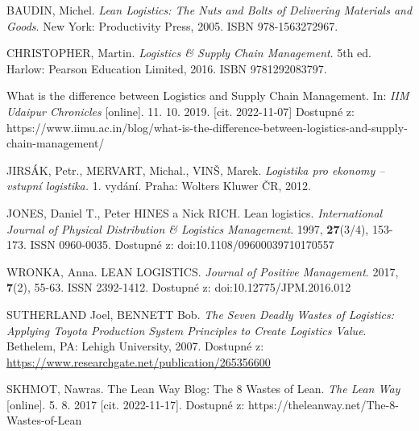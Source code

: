 



\begin{thebibliography}{1}

BAUDIN, Michel. \textit{Lean Logistics: The Nuts and Bolts of Delivering Materials and Goods}. New York: Productivity Press, 2005. ISBN 978-1563272967.

CHRISTOPHER, Martin. \textit{Logistics \& Supply Chain Management}. 5th ed. Harlow: Pearson Education Limited, 2016. ISBN 9781292083797.

What is the difference between Logistics and Supply Chain Management. In: \textit{IIM Udaipur Chronicles} [online]. 11. 10. 2019. [cit. 2022-11-07] Dostupné z: https://www.iimu.ac.in/blog/what-is-the-difference-between-logistics-and-supply-chain-management/

JIRSÁK, Petr., MERVART, Michal., VINŠ, Marek. \textit{Logistika pro ekonomy -- vstupní logistika.} 1. vydání. Praha: Wolters Kluwer ČR, 2012.

JONES, Daniel T., Peter HINES a Nick RICH. Lean logistics. \textit{International Journal of Physical Distribution \& Logistics Management}. 1997, \textbf{27}(3/4), 153-173. ISSN 0960-0035. Dostupné z: doi:10.1108/09600039710170557

WRONKA, Anna. LEAN LOGISTICS. \textit{Journal of Positive Management}. 2017, \textbf{7}(2), 55-63. ISSN 2392-1412. Dostupné z: doi:10.12775/JPM.2016.012

SUTHERLAND Joel, BENNETT Bob. \textit{The Seven Deadly Wastes of Logistics: Applying Toyota Production System Principles to Create Logistics Value}. Bethelem, PA: Lehigh University, 2007. Dostupné z: \url{https://www.researchgate.net/publication/265356600}

SKHMOT, Nawras. The Lean Way Blog: The 8 Wastes of Lean. \textit{The Lean Way} [online]. 5. 8. 2017 [cit. 2022-11-17]. Dostupné z: https://theleanway.net/The-8-Wastes-of-Lean


\end{thebibliography}
